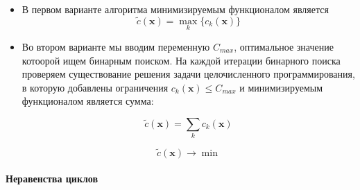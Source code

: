 \documentclass[a4paper,14pt,russian]{article}
\begin{document}
\begin{itemize}
\item В первом варианте алгоритма минимизируемым функционалом является
\begin{equation}
\widetilde{c}(\mathbf{x}) = \displaystyle\max_k \{c_k(\mathbf{x})\}
\end{equation}

\item Во втором варианте мы вводим переменную $C_{max}$, оптимальное значение котоорой ищем бинарным поиском. На каждой итерации бинарного поиска проверяем существование решения задачи целочисленного программирования, в которую добавлены ограничения $c_k(\mathbf{x}) \le C_{max}$ и минимизируемым функционалом является сумма:

\begin{equation}
\widetilde{c}(\mathbf{x}) = \displaystyle\sum_k c_k(\mathbf{x})
\end{equation}

\begin{equation}
\widetilde{c}(\mathbf{x}) \rightarrow \min
\end{equation}

\end{itemize}


\paragraph{Неравенства циклов} ~\\
\end{document}
